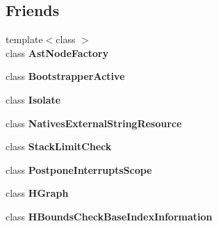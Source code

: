 \subsection*{Friends}
\begin{DoxyCompactItemize}
\item 
\hypertarget{classv8_1_1internal_1_1_v8___f_i_n_a_l_a364577e430004f74753a2a2ead71eddc}{}{\footnotesize template$<$class $>$ }\\class {\bfseries Ast\+Node\+Factory}\label{classv8_1_1internal_1_1_v8___f_i_n_a_l_a364577e430004f74753a2a2ead71eddc}

\item 
\hypertarget{classv8_1_1internal_1_1_v8___f_i_n_a_l_a8d5d5e652a3096853b619c4dd4f99827}{}class {\bfseries Bootstrapper\+Active}\label{classv8_1_1internal_1_1_v8___f_i_n_a_l_a8d5d5e652a3096853b619c4dd4f99827}

\item 
\hypertarget{classv8_1_1internal_1_1_v8___f_i_n_a_l_a07db227c7f4507a7f07fc853cebfa34b}{}class {\bfseries Isolate}\label{classv8_1_1internal_1_1_v8___f_i_n_a_l_a07db227c7f4507a7f07fc853cebfa34b}

\item 
\hypertarget{classv8_1_1internal_1_1_v8___f_i_n_a_l_a4434d79432d349e28ca43c4c89922578}{}class {\bfseries Natives\+External\+String\+Resource}\label{classv8_1_1internal_1_1_v8___f_i_n_a_l_a4434d79432d349e28ca43c4c89922578}

\item 
\hypertarget{classv8_1_1internal_1_1_v8___f_i_n_a_l_ad886bb634836d54ec18f36a04e2a4a3c}{}class {\bfseries Stack\+Limit\+Check}\label{classv8_1_1internal_1_1_v8___f_i_n_a_l_ad886bb634836d54ec18f36a04e2a4a3c}

\item 
\hypertarget{classv8_1_1internal_1_1_v8___f_i_n_a_l_ab43c863bdc4122cb9a67b3ded46d6672}{}class {\bfseries Postpone\+Interrupts\+Scope}\label{classv8_1_1internal_1_1_v8___f_i_n_a_l_ab43c863bdc4122cb9a67b3ded46d6672}

\item 
\hypertarget{classv8_1_1internal_1_1_v8___f_i_n_a_l_aafb6b0d7e2c07dd5b0b599670c46d084}{}class {\bfseries H\+Graph}\label{classv8_1_1internal_1_1_v8___f_i_n_a_l_aafb6b0d7e2c07dd5b0b599670c46d084}

\item 
\hypertarget{classv8_1_1internal_1_1_v8___f_i_n_a_l_ade5995ed4de348e923ab9829ab1da0a6}{}class {\bfseries H\+Bounds\+Check\+Base\+Index\+Information}\label{classv8_1_1internal_1_1_v8___f_i_n_a_l_ade5995ed4de348e923ab9829ab1da0a6}


\end{DoxyCompactItemize}

